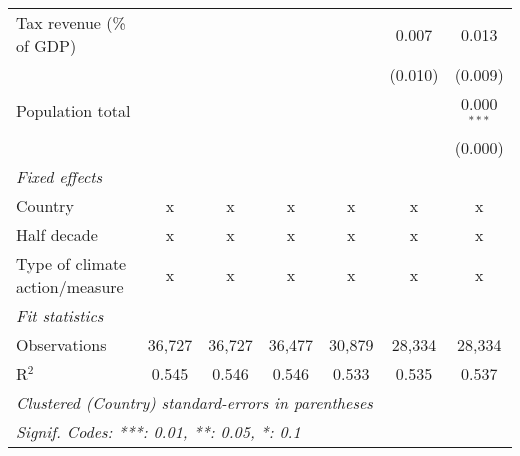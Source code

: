 \begin{tabular}{lcccccc}
   Tax revenue (\% of GDP)                                &         &              &         &         & 0.007   & 0.013\\   
                                                          &         &              &         &         & (0.010) & (0.009)\\   
   Population total                                       &         &              &         &         &         & 0.000$^{***}$\\   
                                                          &         &              &         &         &         & (0.000)\\   
   \emph{Fixed effects}\\
   Country                                                & x       & x            & x       & x       & x       & x\\  
   Half decade                                            & x       & x            & x       & x       & x       & x\\  
   Type of climate action/measure                         & x       & x            & x       & x       & x       & x\\  
   \midrule \emph{Fit statistics}\\
   Observations                                           & 36,727  & 36,727       & 36,477  & 30,879  & 28,334  & 28,334\\  
   R$^2$                                                  & 0.545   & 0.546        & 0.546   & 0.533   & 0.535   & 0.537\\  
   \midrule
   \multicolumn{7}{l}{\emph{Clustered (Country) standard-errors in parentheses}}\\
   \multicolumn{7}{l}{\emph{Signif. Codes: ***: 0.01, **: 0.05, *: 0.1}}\\
\end{tabular}
\par\endgroup


